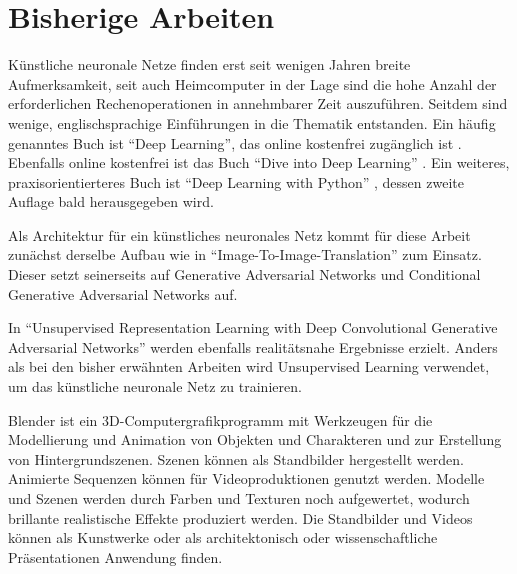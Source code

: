 \section{Bisherige Arbeiten}
\label{sec:related}
Künstliche neuronale Netze finden erst seit wenigen Jahren breite Aufmerksamkeit,
seit auch Heimcomputer in der Lage sind die hohe Anzahl der erforderlichen
Rechenoperationen in annehmbarer Zeit auszuführen. Seitdem sind wenige,
englischsprachige Einführungen in die Thematik entstanden. Ein häufig genanntes
Buch ist ``Deep Learning'', das online kostenfrei zugänglich ist \cite{Goodfellow-et-al-2016}.
Ebenfalls online kostenfrei ist das Buch ``Dive into Deep Learning'' \cite{zhang2020dive}.
Ein weiteres, praxisorientierteres Buch ist ``Deep Learning with Python'' \cite{chollet2017}, dessen
zweite Auflage bald herausgegeben wird.

Als Architektur für ein künstliches neuronales Netz kommt für diese Arbeit
zunächst derselbe Aufbau wie in ``Image-To-Image-Translation'' \cite{isola2018imagetoimage} zum Einsatz. Dieser setzt seinerseits auf Generative
Adversarial Networks \cite{goodfellow2014generative} und Conditional Generative Adversarial Networks \cite{mirza2014conditional} auf.

In ``Unsupervised Representation Learning with Deep Convolutional Generative Adversarial Networks'' \cite{radford2016unsupervised} werden ebenfalls
realitätsnahe Ergebnisse erzielt. Anders als bei den bisher erwähnten Arbeiten
wird Unsupervised Learning verwendet, um das künstliche neuronale Netz zu trainieren.

Blender ist ein 3D-Computergrafikprogramm mit Werkzeugen für die Modellierung und Animation von Objekten und Charakteren und zur Erstellung von Hintergrundszenen. Szenen können als Standbilder hergestellt werden. Animierte Sequenzen können für Videoproduktionen genutzt werden. Modelle und Szenen werden durch Farben und Texturen noch aufgewertet, wodurch brillante realistische Effekte produziert werden. Die Standbilder und Videos können als Kunstwerke oder als architektonisch oder wissenschaftliche Präsentationen Anwendung finden. \cite{blain2020blender}
